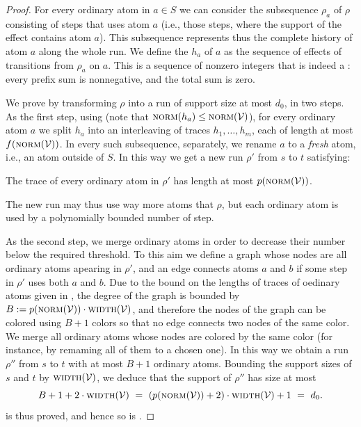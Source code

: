 \documentclass[a4paper,UKenglish,cleveref, autoref, thm-restate,dvipsnames,anonymous]{lipics-v2021}
\begin{document}
\begin{proof}
For every ordinary atom in $a\in S$ we can consider 
the subsequence $\rho_a$ of $\rho$ consisting 
of steps that uses atom $a$ (i.e., those steps, where the support of the effect
contains atom $a$). 
This subsequence represents thus the complete history of atom $a$ along the whole run. 
We define the \emph{\trace} $h_a$ of $a$ as the sequence 
of effects of transitions from $\rho_a$ on $a$.
This is a sequence of nonzero integers that is indeed a \trace:
every prefix sum is nonnegative, and the total sum is zero.

\medskip

We prove  by transforming $\rho$ into a run of support size
at most $d_0$, in two steps.
As the first step, using  (note that $\textsc{norm}(h_a)\leq\textsc{norm}(\mathcal{V})$), 
for every ordinary atom $a$ we split $h_a$ into an interleaving of traces
$h_1, \ldots, h_m$, each of length at most $f(\textsc{norm}(\mathcal{V}))$.
In every such subsequence, separately, we rename $a$ to a \emph{fresh} atom, i.e.,
an atom outside of $S$. 
In this way we get a new run $\rho'$ from $s$ to $t$ satisfying:

\begin{claim} \label{claim:trace-bound}
The trace of every ordinary atom in $\rho'$
has length at most $p(\textsc{norm}(\mathcal{V}))$.
\end{claim}
%
The new run may thus use way more atoms that $\rho$, but each ordinary atom
is used by a polynomially bounded number of step.

As the second step, we merge ordinary atoms in order to decrease their number below the
required threshold.
To this aim we define a graph whose nodes are all ordinary atoms apearing in $\rho'$,
and an edge connects atoms $a$ and $b$ if some step in $\rho'$ uses both $a$ and $b$.
Due to the bound on the lengths of traces of oedinary atoms given in ,
the degree of the graph is bounded by $B:=p(\textsc{norm}(\mathcal{V}))\cdot \textsc{width}(\mathcal{V})$, 
and therefore the nodes of the graph can be colored using $B+1$ colors so that 
no edge connects two nodes of the same color.
We merge all ordinary atoms whose nodes are colored by the same color (for instance,
by remaming all of them to a chosen one). 
In this way we obtain a run $\rho''$ from $s$ to $t$ with at most $B+1$ ordinary atoms. 
Bounding the support sizes of $s$ and $t$ by $\textsc{width}(\mathcal{V})$, we deduce that
the support of $\rho''$ has size at most
\[
B+1 + 2\cdot\textsc{width}(\mathcal{V}) \ = \  (p(\textsc{norm}(\mathcal{V})) + 2)\cdot\textsc{width}(\mathcal{V})+1 \ = \ d_0.
\]
 is thus proved, and hence so is .


\end{proof}
\end{document}
